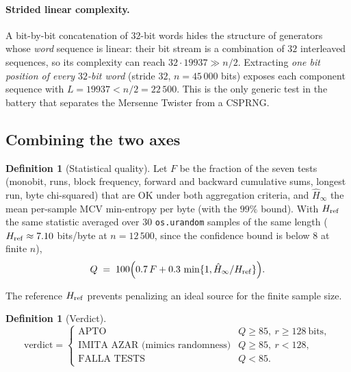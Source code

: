\documentclass[11pt,a4paper]{article}
\theoremstyle{plain}
\theoremstyle{definition}
\newtheorem{definition}[theorem]{Definition}
\begin{document}
\paragraph{Strided linear complexity.} A bit-by-bit concatenation of $32$-bit
words hides the structure of generators whose \emph{word} sequence is linear:
their bit stream is a combination of $32$ interleaved sequences, so its
complexity can reach $32\cdot19937\gg n/2$. Extracting \emph{one bit position
of every $32$-bit word} (stride $32$, $n=45\,000$ bits) exposes each
component sequence with $L=19937<n/2=22\,500$. This is the only generic test in
the battery that separates the Mersenne Twister from a CSPRNG.

\subsection{Combining the two axes}\label{sec:quality}

\begin{definition}[Statistical quality]
Let $F$ be the fraction of the seven tests (monobit, runs, block frequency,
forward and backward cumulative sums, longest run, byte chi-squared) that are
OK under both aggregation criteria, and $\hat H_\infty$ the mean per-sample MCV
min-entropy per byte (with the $99\%$ bound). With $H_{\rm ref}$ the same
statistic averaged over $30$ \texttt{os.urandom} samples of the same length
($H_{\rm ref}\approx7.10$ bits/byte at $n=12\,500$, since the confidence bound
is below $8$ at finite $n$),
\begin{equation}
    Q \;=\; 100\Big(0.7\,F+0.3\,\min\{1,\hat H_\infty/H_{\rm ref}\}\Big).
\end{equation}
\end{definition}

The reference $H_{\rm ref}$ prevents penalizing an ideal source for the finite
sample size.

\begin{definition}[Verdict]
\begin{equation}
    \text{verdict}=
    \begin{cases}
        \text{APTO} & Q\ge85,\ r\ge128\ \text{bits},\\
        \text{IMITA AZAR (mimics randomness)} & Q\ge85,\ r<128,\\
        \text{FALLA TESTS} & Q<85.
    \end{cases}
\end{equation}
\end{definition}
\end{document}
